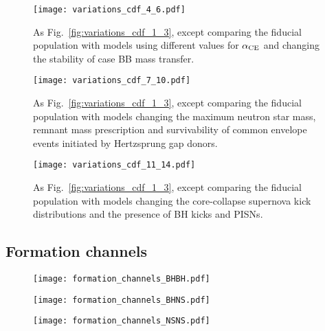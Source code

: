 \begin{figure*}[h]
    \centering
    \texttt{[image: variations\_cdf\_4\_6.pdf]}
    \caption{As Fig.~\ref{fig:variations_cdf_1_3}, except comparing the fiducial population with models using different values for $\alpha_{\rm CE}$ and changing the stability of case BB mass transfer.}
    \label{fig:variations_cdf_4_6}
\end{figure*}

\begin{figure*}[h]
    \centering
    \texttt{[image: variations\_cdf\_7\_10.pdf]}
    \caption{As Fig.~\ref{fig:variations_cdf_1_3}, except comparing the fiducial population with models changing the maximum neutron star mass, remnant mass prescription and survivability of common envelope events initiated by Hertzsprung gap donors.}
    \label{fig:variations_cdf_7_10}
\end{figure*}

\begin{figure*}[h]
    \centering
    \texttt{[image: variations\_cdf\_11\_14.pdf]}
    \caption{As Fig.~\ref{fig:variations_cdf_1_3}, except comparing the fiducial population with models changing the core-collapse supernova kick distributions and the presence of BH kicks and PISNs.}
    \label{fig:variations_cdf_11_14}
\end{figure*}

\subsection{Formation channels}

\begin{figure}
    \centering
    \texttt{[image: formation\_channels\_BHBH.pdf]}
\end{figure}

\begin{figure}
    \centering
    \texttt{[image: formation\_channels\_BHNS.pdf]}
\end{figure}

\begin{figure}
    \centering
    \texttt{[image: formation\_channels\_NSNS.pdf]}
\end{figure}